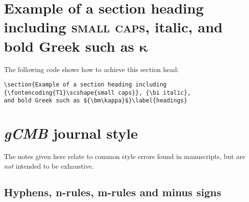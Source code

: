 \documentclass{gCMB2e}
\begin{document}
\section{Example of a section heading including {\scshape{small caps}},
   {\bi italic}, and bold Greek such as ${\bm\kappa}$}\label{headings}

The following code shows how to achieve this section head:
%
\begin{verbatim}
\section{Example of a section heading including
{\fontencoding{T1}\scshape{small caps}}, {\bi italic},
and bold Greek such as ${\bm\kappa}$}\label{headings}
\end{verbatim}


\section{{\textit{gCMB}} journal style}

The notes given here relate to common style errors found in manuscripts, but are {\itshape not\/}
intended to be exhaustive.


\subsection{Hyphens, n-rules, m-rules and minus signs}\label{dashes}
\end{document}
